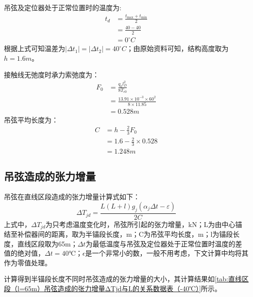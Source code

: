 吊弦及定位器处于正常位置时的温度为:
\begin{align*}
	t_d&=\frac{t_{\max}+t_{\min}}{2}
	\\
	&=\frac{40-40}{2}
	\\
	&=0^{\circ}C
\end{align*}
根据上式可知温差为$|\Delta t_1|=|\Delta t_2|=40^{\circ}C$；由原始资料可知，结构高度取为$h=1.6m$。

接触线无弛度时承力索弛度为：
\begin{align*}
	F_0&=\frac{q_0l_{D}^{2}}{8T_{c0}}
	\\
	&=\frac{13.91\times 10^{-3}\times 60^2}{8\times 11.85}
	\\
	&=0.528m
\end{align*}
吊弦平均长度为：
\begin{align*}
	C&=h-\frac{2}{3}F_0
	\\
	&=1.6-\frac{2}{3}\times 0.528
	\\
	&=1.248m
\end{align*}

\subsection{吊弦造成的张力增量}
吊弦在直线区段造成的张力增量计算式如下：
$$
\varDelta T_{jd}=\frac{L(L+l)g_j(\alpha _j\varDelta t-\varepsilon )}{2C}
$$
上式中，$\Delta T_{jd}$为只考虑温度变化时，吊弦所引起的张力增量，kN；L为由中心锚结至补偿器间的距离，取为半锚段长度，m；C为吊弦平均长度，m；l为锚段长度，直线区段取为65m；$\Delta t$为最低温度与吊弦及定位器处于正常位置时温度的差值的绝对值，$\Delta t=40℃$；$\epsilon$是一个非常小的数，一般不用考虑，下文计算中均将其作为零值处理。

计算得到半锚段长度不同时吊弦造成的张力增量的大小，其计算结果如\ref{tab:直线区段（l=65m）吊弦造成的张力增量ΔTjd与L的关系数据表（-40℃）}所示。
\begin{table}[H]
	\centering
	\caption{直线区段（l=65m）吊弦造成的张力增量ΔTjd与L的关系数据表（-40℃）
	}
	\label{tab:直线区段（l=65m）吊弦造成的张力增量ΔTjd与L的关系数据表（-40℃）}
\end{table}

